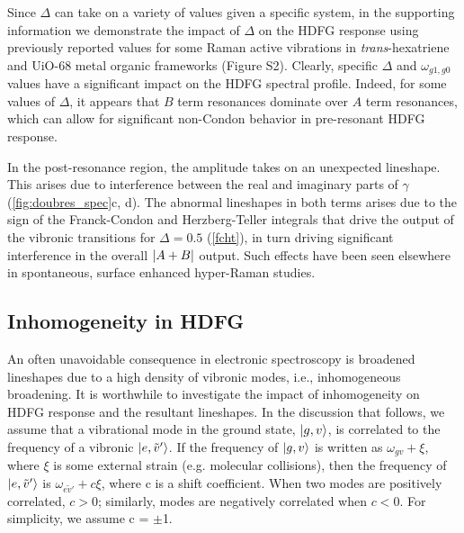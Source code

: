 \documentclass[aip, jcp, reprint, onecolumn, nofootinbib]{revtex4-2}
\begin{document}
Since $\Delta$ can take on a variety of values given a specific system, in the supporting information we demonstrate the impact of $\Delta$ on the HDFG response using previously reported values for some Raman active vibrations in \textit{trans}-hexatriene and UiO-68 metal organic frameworks (Figure S2). \cite{Myers1982, Brennan2024}
Clearly, specific $\Delta$ and $\omega_{g1, g0}$ values have a significant impact on the HDFG spectral profile.
Indeed, for some values of $\Delta$, it appears that $B$ term resonances dominate over $A$ term resonances, which can allow for significant non-Condon behavior in pre-resonant HDFG response.

In the post-resonance region, the amplitude takes on an unexpected lineshape.
This arises due to interference between the real and imaginary parts of $\gamma$ (\autoref{fig:doubres_spec}c, d).
The abnormal lineshapes in both terms arises due to the sign of the Franck-Condon and Herzberg-Teller integrals that drive the output of the vibronic transitions for $\Delta = 0.5$ (\autoref{fcht}), in turn driving significant interference in the overall $\abs{A+B}$ output.
Such effects have been seen elsewhere in spontaneous, surface enhanced hyper-Raman studies. \cite{Milojevich2011}


\subsection{Inhomogeneity in HDFG}
An often unavoidable consequence in electronic spectroscopy is broadened lineshapes due to a high density of vibronic modes, i.e., inhomogeneous broadening.
It is worthwhile to investigate the impact of inhomogeneity on HDFG response and the resultant lineshapes. 
In the discussion that follows, we assume that a vibrational mode in the ground state, $\ket{g,v}$, is correlated to the frequency of a vibronic $\ket{e,\tilde{v}'}$.\cite{Carlson1990line, Dong2015}
If the frequency of $\ket{g,v}$ is written as $\omega_{gv} + \xi$, where $\xi$ is some external strain (e.g. molecular collisions), then the frequency of $\ket{e,\tilde{v}'}$ is $\omega_{e\tilde{v}'} + c\xi$, where c is a shift coefficient.
When two modes are positively correlated, $c > 0$; similarly, modes are negatively correlated when $c < 0$.
For simplicity, we assume c = $\pm$1.
\end{document}
